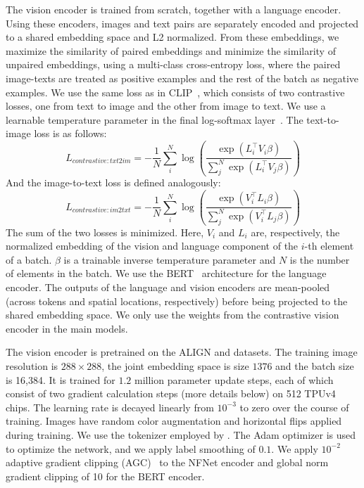 The vision encoder is trained from scratch, together with a language encoder. Using these encoders, images and text pairs are separately encoded and projected to a shared embedding space and L2 normalized. 
From these embeddings, we maximize the similarity of paired embeddings and minimize the similarity of unpaired embeddings, using a multi-class cross-entropy loss, where the paired image-texts are treated as positive examples and the rest of the batch as negative examples.
We use the same loss as in CLIP~\citep{clip}, which consists of two contrastive losses, one from text to image and the other from image to text. We use a learnable temperature parameter in the final log-softmax layer~\citep{bridle1990probabilistic}.
The text-to-image loss is as follows:
\begin{equation}
    L_{contrastive:txt2im} = -\frac{1}{N} \sum_{i}^{N} \log \left( \frac{\exp (L_{i}^{\intercal} V_{i} \beta)}{\sum_{j}^{N} \exp (L_{i}^{\intercal} V_{j} \beta)}  \right)
\end{equation}
And the image-to-text loss is defined analogously:
\begin{equation}
    L_{contrastive:im2txt} = -\frac{1}{N} \sum_{i}^{N} \log \left( \frac{\exp (V_{i}^{\intercal} L_{i} \beta)}{\sum_{j}^{N} \exp (V_{i}^{\intercal} L_{j} \beta)}  \right)
\end{equation}
The sum of the two losses is minimized.
Here, $V_{i}$ and $L_{i}$ are, respectively, the normalized embedding of the vision and language component of the $i$-th element of a batch.
$\beta$ is a trainable inverse temperature parameter and $N$ is the number of elements in the batch.
We use the BERT~\citep{bert} architecture for the language encoder. The outputs of the language and vision encoders are mean-pooled (across tokens and spatial locations, respectively) before being projected to the shared embedding space. We only use the weights from the contrastive vision encoder in the main \method{} models. 


The vision encoder is pretrained on the ALIGN and \shortimagetextpairs{} datasets.
The training image resolution is $288\times288$, the joint embedding space is size $1376$ and the batch size is 16,384. 
It is trained for $1.2$ million parameter update steps, each of which consist of two gradient calculation steps (more details below) on 512 TPUv4 chips. The learning rate is decayed linearly from $10^{-3}$ to zero over the course of training. Images have random color augmentation and horizontal flips applied during training. We use the tokenizer employed by \citet{align}. 
The Adam optimizer is used to optimize the network, and we apply label smoothing of $0.1$. 
We apply $10^{-2}$ adaptive gradient clipping (AGC)~\citep{nfnets} to the NFNet encoder and global norm gradient clipping of 10 for the BERT encoder. 

